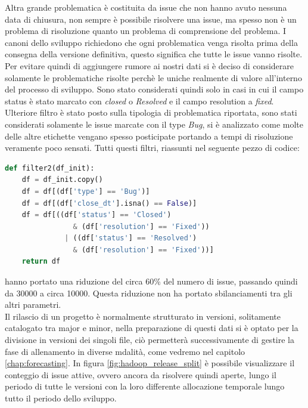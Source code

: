 \documentclass[%
    corpo=12pt,
    twoside,
    oldstyle,
    autoretitolo,
    greek,
    evenboxes,
]{toptesi}
\begin{document}
Altra grande problematica è costituita da issue che non hanno avuto nessuna data di chiusura, non sempre è possibile risolvere una issue, ma spesso non è un problema di risoluzione quanto un problema di comprensione del problema. I canoni dello sviluppo richiedono che ogni problematica venga risolta prima della consegna della versione definitiva, questo significa che tutte le issue vanno risolte. Per evitare quindi di aggiungere rumore ai nostri dati si è deciso di considerare solamente le problematiche risolte perchè le uniche realmente di valore all'interno del processo di sviluppo. Sono stato considerati quindi solo in casi in cui il campo status è stato marcato con \textit{closed} o \textit{Resolved} e il campo resolution a \textit{fixed}.
Ulteriore filtro è stato posto sulla tipologia di problematica riportata, sono stati considerati solamente le issue marcate con il type \textit{Bug}, si è analizzato come molte delle altre etichette vengano spesso posticipate portando a tempi di risoluzione veramente poco sensati. Tutti questi filtri, riassunti nel seguente pezzo di codice:
\begin{lstlisting}[language=Python, frame=single, basicstyle=\small]
  def filter2(df_init):
    df = df_init.copy()
    df = df[(df['type'] == 'Bug')]
    df = df[(df['close_dt'].isna() == False)]
    df = df[((df['status'] == 'Closed') 
                & (df['resolution'] == 'Fixed')) 
              | ((df['status'] == 'Resolved') 
                & (df['resolution'] == 'Fixed'))]
    return df
\end{lstlisting}
hanno portato una riduzione del circa 60\% del numero di issue, passando quindi da 30000 a circa 10000. Questa riduzione non ha portato sbilanciamenti tra gli altri parametri.\\
Il rilascio di un progetto è normalmente strutturato in versioni, solitamente catalogato tra major e minor, nella preparazione di questi dati si è optato per la divisione in versioni dei singoli file, ciò permetterà successivamente di gestire la fase di allenamento in diverse mdalità, come vedremo nel capitolo \ref{chap:forecasting}. In figura \ref{fig:hadoop_release_split} è possibile visualizzare il conteggio di issue attive, ovvero ancora da risolvere quindi aperte, lungo il periodo di tutte le versioni con la loro differente allocazione temporale lungo tutto il periodo dello sviluppo.\\
\end{document}
